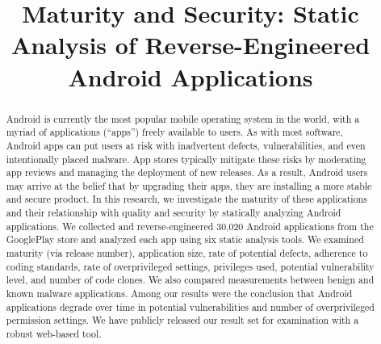 \documentclass[conference]{IEEEtran}
\begin{document}
%
\title{Maturity and Security: Static Analysis of Reverse-Engineered Android Applications}

\author{
}








\maketitle


\begin{abstract}

Android is currently the most popular mobile operating system in the world, with a myriad of applications (``apps'') freely available to users. As with most software, Android apps can put users at risk with inadvertent defects, vulnerabilities, and even intentionally placed malware. App stores typically mitigate these risks by moderating app reviews and managing the deployment of new releases. As a result, Android users may arrive at the belief that by upgrading their apps, they are installing a more stable and secure product. In this research, we investigate the maturity of these applications and their relationship with quality and security by statically analyzing Android applications. We collected and reverse-engineered 30,020 Android applications from the GooglePlay store and analyzed each app using six static analysis tools. We examined maturity (via release number), application size, rate of potential defects, adherence to coding standards, rate of overprivileged settings, privileges used, potential vulnerability level, and number of code clones. We also compared measurements between benign and known malware applications. Among our results were the conclusion that Android applications degrade over time in potential vulnerabilities and number of overprivileged permission settings. We have publicly released our result set for examination with a robust web-based tool.
\end{abstract}
\end{document}
